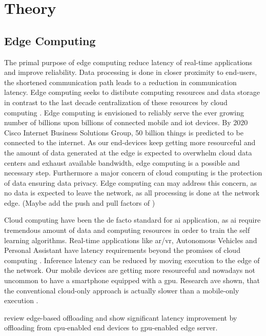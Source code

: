 \hypertarget{theory}{%
	\chapter{Theory}\label{ch:theory}}
\thispagestyle{fancy}

\section{Edge Computing}

The primal purpose of edge computing reduce latency of real-time applications and improve reliability. Data processing is done in closer proximity to end-users, the shortened communication path leads to a reduction in communication latency. Edge computing seeks to distibute computing resources and data storage in contrast to the last decade centralization of these resources by cloud computing \cite{shi_edge_2016}. Edge computing is envisioned to reliably serve the ever growing number of billions upon billions of connected mobile and \gls{iot} devices. By 2020 Cisco Internet Business Solutions Group, 50 billion things is predicted to be connected to the internet.  As our end-devices keep getting more resourceful and the amount of data generated at the edge is expected to overwhelm cloud data centers and exhaust available bandwidth, edge computing is a possible and necessary step. Furthermore a major concern of cloud computing is the protection of data ensuring data privacy. Edge computing can may address this concern, as no data is expected to leave the network, as all processing is done at the network edge. (Maybe add the push and pull factors of \cite{zhou_edge_2019}) 

Cloud computing have been the de facto standard for \gls{ai} application, as \gls{ai} require tremendous amount of data and computing resources in order to train the self learning algorithms. Real-time applications like \gls{ar}/\gls{vr}, Autonomous Vehicles and Personal Assistant have latency requirements beyond the promises of cloud computing \cite{bibid}. Inference latency can be reduced by moving execution to the edge of the network. Our mobile devices are getting more resourceful and nowadays not uncommon to have a smartphone equipped with a \gls{gpu}. Research ave shown, that the conventional cloud-only approach is actually slower than a mobile-only execution \cite{kang_neurosurgeon:_2017}.

\cite{karlsen_prototyping_nodate} review edge-based offloading and show significant latency improvement by offloading from \gls{cpu}-enabled end devices to \gls{gpu}-enabled edge server. 


